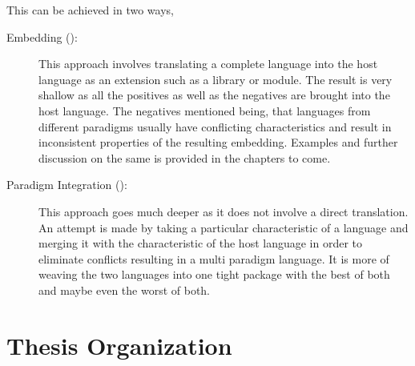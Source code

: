 \documentclass[thesis-solanki.tex]{subfiles}
\begin{document}
This can be achieved in two ways,
\begin{description}
\item [Embedding ():]

  This approach involves translating a complete language into the host language as an extension such as a
  library or module.
  The result is very shallow as all the positives as well as the negatives are brought into the host language.
  The negatives mentioned being, that languages from different paradigms usually have conflicting characteristics
  and result in inconsistent properties of the resulting embedding.
  Examples and further discussion on the same is provided in the chapters to come.

\item [Paradigm Integration ():]

  This approach goes much deeper as it does not involve a direct translation.
  An attempt is made by taking a particular characteristic of a language and merging it with the characteristic of
  the host language in order to eliminate conflicts resulting in a multi paradigm language.
  It is more of weaving the two languages into one tight package with the best of both and maybe even the worst of
  both.
\end{description}


%






\section{Thesis Organization}
\end{document}
